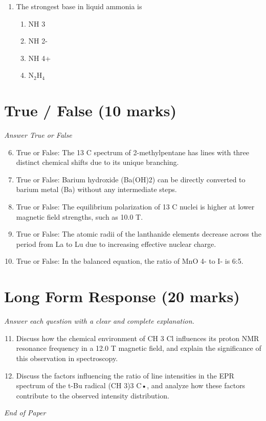 \documentclass[12pt]{article}
\begin{document}
\begin{enumerate}[label=\arabic*.]
\begin{enumerate}[label=(\alph*)]
    \item It significantly increases the pH.
    \item It significantly decreases the pH.
    \item It changes the pH asymptotically to the pKa of the acid.
\end{enumerate}
\item The strongest base in liquid ammonia is
\begin{enumerate}[label=(\alph*)]
    \item NH 3
    \item NH 2-
    \item NH 4+
    \item N$_{2}$H$_{4}$
\end{enumerate}
\end{enumerate}

\section*{True / False (10 marks)}
\textit{Answer True or False}
\begin{enumerate}[label=\arabic*.]
\setcounter{enumi}{5}
\item True or False: The 13 C spectrum of 2-methylpentane has lines with three distinct chemical shifts due to its unique branching.
\item True or False: Barium hydroxide (Ba(OH)2) can be directly converted to barium metal (Ba) without any intermediate steps.
\item True or False: The equilibrium polarization of 13 C nuclei is higher at lower magnetic field strengths, such as 10.0 T.
\item True or False: The atomic radii of the lanthanide elements decrease across the period from La to Lu due to increasing effective nuclear charge.
\item True or False: In the balanced equation, the ratio of MnO 4- to I- is 6:5.
\end{enumerate}

\section*{Long Form Response (20 marks)}
\textit{Answer each question with a clear and complete explanation.}
\begin{enumerate}[label=\arabic*.]
\setcounter{enumi}{10}
\item Discuss how the chemical environment of CH 3 Cl influences its proton NMR resonance frequency in a 12.0 T magnetic field, and explain the significance of this observation in spectroscopy.
\item Discuss the factors influencing the ratio of line intensities in the EPR spectrum of the t-Bu radical (CH 3)3 C•, and analyze how these factors contribute to the observed intensity distribution.
\end{enumerate}

\vfill
\noindent\textit{End of Paper}
\end{document}
